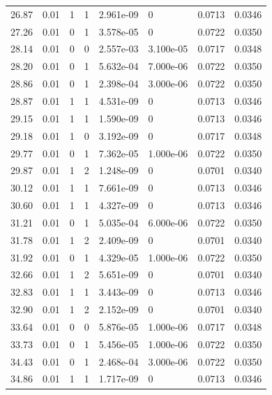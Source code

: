 \documentclass[preview]{standalone}
\begin{document}
{{{\begin{tabular}{L{1.2cm}C{1.2cm} C{0.3cm}C{0.5cm} C{1.4cm}C{1.4cm} C{1.4cm}C{1.4cm}}
  26.87  &  0.01  & 1     &  1 &  2.961e-09  & 0  & 0.0713 &  0.0346   \\ 
  27.26  &  0.01  & 0     &  1 &  3.578e-05  & 0  & 0.0722 &  0.0350   \\ 
  28.14  &  0.01  & 0     &  0 &  2.557e-03  & 3.100e-05  & 0.0717 &  0.0348   \\ 
  28.20  &  0.01  & 0     &  1 &  5.632e-04  & 7.000e-06  & 0.0722 &  0.0350   \\ 
  28.86  &  0.01  & 0     &  1 &  2.398e-04  & 3.000e-06  & 0.0722 &  0.0350   \\ 
  28.87  &  0.01  & 1     &  1 &  4.531e-09  & 0  & 0.0713 &  0.0346   \\ 
  29.15  &  0.01  & 1     &  1 &  1.590e-09  & 0  & 0.0713 &  0.0346   \\ 
  29.18  &  0.01  & 1     &  0 &  3.192e-09  & 0  & 0.0717 &  0.0348   \\ 
  29.77  &  0.01  & 0     &  1 &  7.362e-05  & 1.000e-06  & 0.0722 &  0.0350   \\ 
  29.87  &  0.01  & 1     &  2 &  1.248e-09  & 0  & 0.0701 &  0.0340   \\ 
  30.12  &  0.01  & 1     &  1 &  7.661e-09  & 0  & 0.0713 &  0.0346   \\ 
  30.60  &  0.01  & 1     &  1 &  4.327e-09  & 0  & 0.0713 &  0.0346   \\ 
  31.21  &  0.01  & 0     &  1 &  5.035e-04  & 6.000e-06  & 0.0722 &  0.0350   \\ 
  31.78  &  0.01  & 1     &  2 &  2.409e-09  & 0  & 0.0701 &  0.0340   \\ 
  31.92  &  0.01  & 0     &  1 &  4.329e-05  & 1.000e-06  & 0.0722 &  0.0350   \\ 
  32.66  &  0.01  & 1     &  2 &  5.651e-09  & 0  & 0.0701 &  0.0340   \\ 
  32.83  &  0.01  & 1     &  1 &  3.443e-09  & 0  & 0.0713 &  0.0346   \\ 
  32.90  &  0.01  & 1     &  2 &  2.152e-09  & 0  & 0.0701 &  0.0340   \\ 
  33.64  &  0.01  & 0     &  0 &  5.876e-05  & 1.000e-06  & 0.0717 &  0.0348   \\ 
  33.73  &  0.01  & 0     &  1 &  5.456e-05  & 1.000e-06  & 0.0722 &  0.0350   \\ 
  34.43  &  0.01  & 0     &  1 &  2.468e-04  & 3.000e-06  & 0.0722 &  0.0350   \\ 
  34.86  &  0.01  & 1     &  1 &  1.717e-09  & 0  & 0.0713 &  0.0346   \\ 

\end{tabular}}}}
\end{document}
